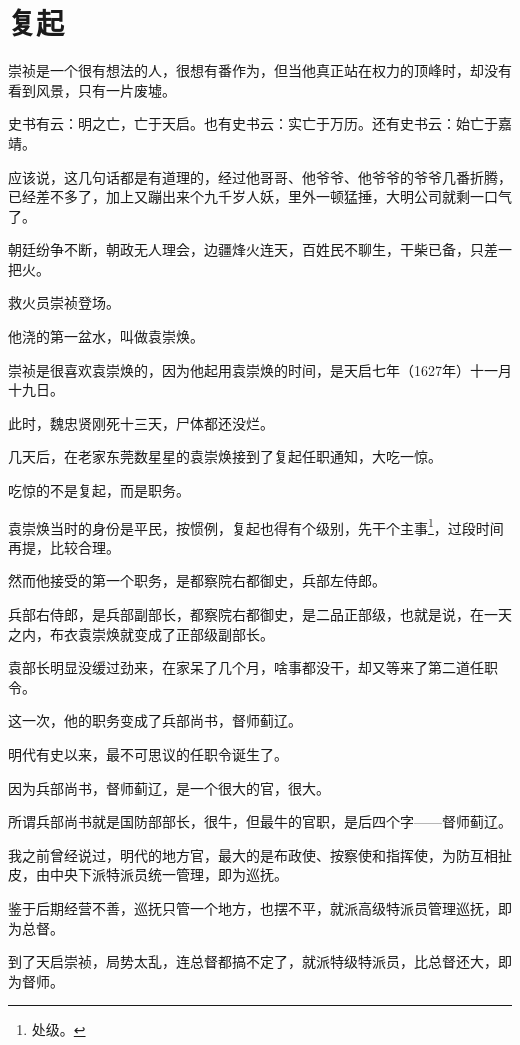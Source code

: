 \section{复起}
\ifnum{}
	\begin{multicols}{\theparacolNo}
		\fi
		崇祯是一个很有想法的人，很想有番作为，但当他真正站在权力的顶峰时，却没有看到风景，只有一片废墟。

		史书有云：明之亡，亡于天启。也有史书云：实亡于万历。还有史书云：始亡于嘉靖。

		应该说，这几句话都是有道理的，经过他哥哥、他爷爷、他爷爷的爷爷几番折腾，已经差不多了，加上又蹦出来个九千岁人妖，里外一顿猛捶，大明公司就剩一口气了。

		朝廷纷争不断，朝政无人理会，边疆烽火连天，百姓民不聊生，干柴已备，只差一把火。

		救火员崇祯登场。

		他浇的第一盆水，叫做袁崇焕。

		崇祯是很喜欢袁崇焕的，因为他起用袁崇焕的时间，是天启七年（1627年）十一月十九日。

		此时，魏忠贤刚死十三天，尸体都还没烂。

		几天后，在老家东莞数星星的袁崇焕接到了复起任职通知，大吃一惊。

		吃惊的不是复起，而是职务。

		袁崇焕当时的身份是平民，按惯例，复起也得有个级别，先干个主事\footnote{处级。}，过段时间再提，比较合理。

		然而他接受的第一个职务，是都察院右都御史，兵部左侍郎。

		兵部右侍郎，是兵部副部长，都察院右都御史，是二品正部级，也就是说，在一天之内，布衣袁崇焕就变成了正部级副部长。

		袁部长明显没缓过劲来，在家呆了几个月，啥事都没干，却又等来了第二道任职令。

		这一次，他的职务变成了兵部尚书，督师蓟辽。

		明代有史以来，最不可思议的任职令诞生了。

		因为兵部尚书，督师蓟辽，是一个很大的官，很大。

		所谓兵部尚书就是国防部部长，很牛，但最牛的官职，是后四个字——督师蓟辽。

		我之前曾经说过，明代的地方官，最大的是布政使、按察使和指挥使，为防互相扯皮，由中央下派特派员统一管理，即为巡抚。

		鉴于后期经营不善，巡抚只管一个地方，也摆不平，就派高级特派员管理巡抚，即为总督。

		到了天启崇祯，局势太乱，连总督都搞不定了，就派特级特派员，比总督还大，即为督师。


\end{multicols}
